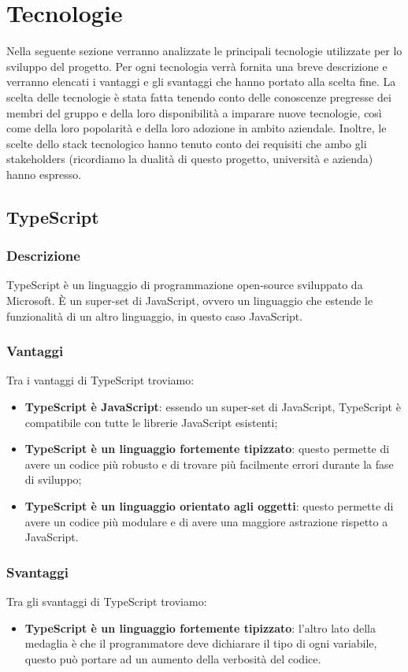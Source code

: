 \section*{Tecnologie}
Nella seguente sezione verranno analizzate le principali tecnologie utilizzate per lo sviluppo del progetto.
Per ogni tecnologia verrà fornita una breve descrizione e verranno elencati i vantaggi e gli svantaggi che hanno portato alla scelta fine.
La scelta delle tecnologie è stata fatta tenendo conto delle conoscenze pregresse dei membri del gruppo e della loro disponibilità a imparare nuove tecnologie, così
come della loro popolarità e della loro adozione in ambito aziendale. Inoltre, le scelte dello stack tecnologico hanno tenuto conto
dei requisiti che ambo gli stakeholders (ricordiamo la dualità di questo progetto, università e azienda) hanno espresso.

\subsection*{TypeScript}

\subsubsection*{Descrizione}
TypeScript è un linguaggio di programmazione open-source sviluppato da Microsoft.
È un super-set di JavaScript, ovvero un linguaggio che estende le funzionalità di un altro linguaggio, in questo caso JavaScript.

\subsubsection*{Vantaggi}
Tra i vantaggi di TypeScript troviamo:
\begin{itemize}
    \item \textbf{TypeScript è JavaScript}: essendo un super-set di JavaScript, TypeScript è compatibile con tutte le librerie JavaScript esistenti;
    \item \textbf{TypeScript è un linguaggio fortemente tipizzato}: questo permette di avere un codice più robusto e di trovare più facilmente errori durante la fase di sviluppo;
    \item \textbf{TypeScript è un linguaggio orientato agli oggetti}: questo permette di avere un codice più modulare e di avere una maggiore astrazione rispetto a JavaScript.
\end{itemize}

\subsubsection*{Svantaggi}
Tra gli svantaggi di TypeScript troviamo:
\begin{itemize}
    \item \textbf{TypeScript è un linguaggio fortemente tipizzato}: l'altro lato della medaglia è che il programmatore deve dichiarare il tipo di ogni variabile, questo può portare ad un aumento della verbosità del codice.
\end{itemize}


